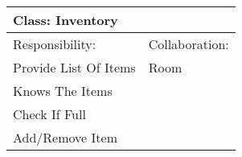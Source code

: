\vspace{0.4cm}
\begin{tabular}{|p{7cm}|p{7cm}|} \hline
\multicolumn{2}{|l|}{Class:  Inventory} \\ \hline
Responsibility:  & Collaboration:  \\ \hline
 Provide List Of Items &  Room \\ 
 Knows The Items &   \\ 
 Check If Full &   \\ 
 Add/Remove Item &   \\ 
\hline
\end{tabular}
\vspace{0.8cm}
